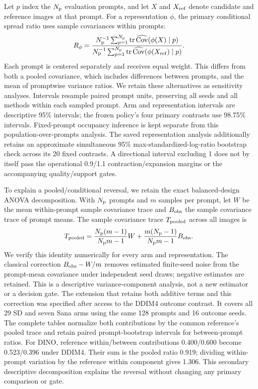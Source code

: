 Let $p$ index the $N_{\rm p}$ evaluation prompts, and let $X$ and
$X_{\rm ref}$ denote candidate and reference images at that prompt.
For a representation $\phi$, the primary conditional spread ratio
uses sample covariances within prompts:
\begin{equation}
 R_\phi=\frac{N_{\rm p}^{-1}\sum_{p=1}^{N_{\rm p}}\operatorname{tr}
 \widehat{\operatorname{Cov}}(\phi(X)\mid p)}
 {N_{\rm p}^{-1}\sum_{p=1}^{N_{\rm p}}\operatorname{tr}
 \widehat{\operatorname{Cov}}(\phi(X_{\rm ref})\mid p)}.
\label{eq:supp_prompt_spread}
\end{equation}
Each prompt is centered separately and receives equal weight. This differs from
both a pooled covariance, which includes differences between prompts, and the
mean of promptwise variance ratios. We retain these alternatives as sensitivity
analyses. Intervals resample paired prompt units, preserving all seeds and all
methods within each sampled prompt. Arm and representation intervals are
descriptive 95\% intervals; the frozen policy's four primary contrasts use
98.75\% intervals. Fixed-prompt occupancy inference is kept separate from this
population-over-prompts analysis.
The saved representation analysis additionally retains an approximate simultaneous
95\% max-standardized-log-ratio bootstrap check across its 20 fixed contrasts.
A directional interval excluding 1 does not by itself pass the operational
0.9/1.1 contraction/expansion margins or the accompanying quality/support gates.

To explain a pooled/conditional reversal, we retain the exact balanced-design
ANOVA decomposition. With $N_{\rm p}$ prompts and $m$ samples per prompt,
let $W$ be the mean within-prompt sample covariance trace and $B_{\rm obs}$
the sample covariance trace of prompt means. The sample covariance trace
$T_{\rm pooled}$ across all images is
\begin{equation}
 T_{\rm pooled}=\frac{N_{\rm p}(m-1)}{N_{\rm p}m-1}W
              +\frac{m(N_{\rm p}-1)}{N_{\rm p}m-1}B_{\rm obs}.
\label{eq:supp_prompt_anova}
\end{equation}
We verify this identity numerically for every arm and representation. The
classical correction $B_{\rm obs}-W/m$ removes estimated finite-seed noise
from the prompt-mean covariance under independent seed draws; negative
estimates are retained. This is a descriptive variance-component analysis,
not a new estimator or a decision gate. The extension that retains both additive terms and this correction was
specified after access to the DDIM4 outcome contrast. It covers all 29 SD
and seven Sana arms using the same 128 prompts and 16 outcome seeds. The complete tables normalize both contributions by the common reference's
pooled trace and retain paired prompt-bootstrap intervals for between-prompt
ratios. For DINO, reference within/between contributions 0.400/0.600 become
0.523/0.396 under DDIM4. Their sum is the pooled ratio 0.919; dividing
within-prompt variation by the reference within component gives 1.306.
This secondary descriptive decomposition explains the reversal without
changing any primary comparison or gate.

